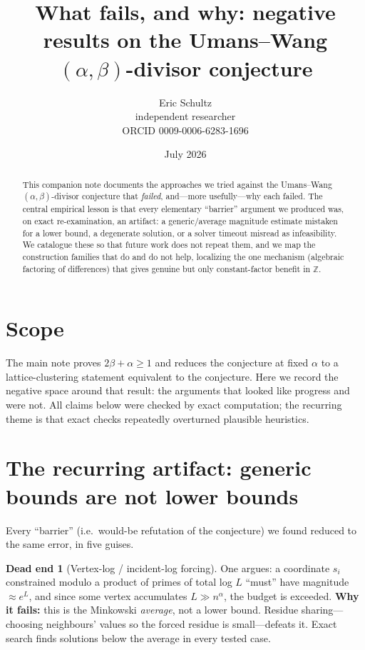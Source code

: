 \documentclass[11pt]{article}
\title{What fails, and why: negative results on the Umans--Wang \\
$(\alpha,\beta)$-divisor conjecture}
\author{Eric Schultz\\ \small independent researcher \\ \small ORCID 0009-0006-6283-1696}
\date{July 2026}
\theoremstyle{definition}
\newtheorem{deadend}{Dead end}
\newcommand{\Z}{\mathbb{Z}}
\begin{document}
\maketitle

\begin{abstract}
This companion note documents the approaches we tried against the Umans--Wang
$(\alpha,\beta)$-divisor conjecture that \emph{failed}, and---more usefully---why
each failed. The central empirical lesson is that every elementary ``barrier''
argument we produced was, on exact re-examination, an artifact: a
generic/average magnitude estimate mistaken for a lower bound, a degenerate
solution, or a solver timeout misread as infeasibility. We catalogue these so that
future work does not repeat them, and we map the construction families that do and
do not help, localizing the one mechanism (algebraic factoring of differences) that
gives genuine but only constant-factor benefit in $\Z$.
\end{abstract}

\section{Scope}
The main note \cite{main} proves $2\beta+\alpha\ge 1$ and reduces the conjecture at
fixed $\alpha$ to a lattice-clustering statement equivalent to the conjecture. Here
we record the negative space around that result: the arguments that looked like
progress and were not. All claims below were checked by exact computation; the
recurring theme is that exact checks repeatedly overturned plausible heuristics.

\section{The recurring artifact: generic bounds are not lower bounds}

Every ``barrier'' (i.e.\ would-be refutation of the conjecture) we found reduced to
the same error, in five guises.

\begin{deadend}[Vertex-log / incident-log forcing]
One argues: a coordinate $s_i$ constrained modulo a product of primes of total log
$L$ ``must'' have magnitude $\approx e^{L}$, and since some vertex accumulates
$L\gg n^{\alpha}$, the budget is exceeded. \textbf{Why it fails:} this is the
Minkowski \emph{average}, not a lower bound. Residue sharing---choosing neighbours'
values so the forced residue is small---defeats it. Exact search finds solutions
below the average in every tested case.
\end{deadend}
\end{document}
